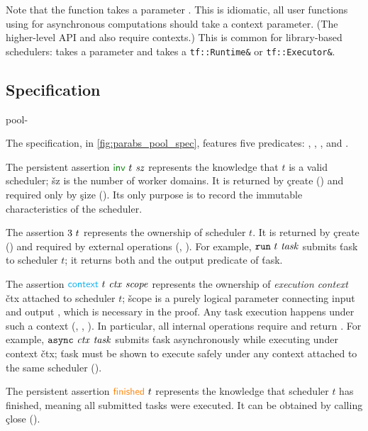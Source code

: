 Note that the  function takes a parameter . This is idiomatic, all user functions using  for asynchronous computations should take a context parameter. (The higher-level API  and  also require contexts.) This is common for library-based schedulers: \Domainslib takes a  parameter and \Taskflow takes a \texttt{tf::Runtime\&} or \texttt{tf::Executor\&}.

\subsection{Specification}
\label{sec:parabs_pool_spec}

\begin{tirPrefix}{pool-}



The specification, in \cref{fig:parabs_pool_spec}, features five predicates: \inv, \model, \context, \finished and \obligation.

The persistent assertion $\inv\ t\ \v{sz}$ represents the knowledge that $t$ is a valid scheduler; \v{sz} is the number of worker domains.
It is returned by \c{create} () and required only by \c{size} ().
Its only purpose is to record the immutable characteristics of the scheduler.

The assertion $3\ t$ represents the ownership of scheduler $t$.
It is returned by \c{create} () and required by external operations (, ).
For example, $\c{run}\ t\ \v{task}$ submits \v{task} to scheduler $t$; it returns both \model and the output predicate of \v{task}.

The assertion $\context\ t\ \v{ctx}\ \v{scope}$ represents the ownership of \emph{execution context} \v{ctx} attached to scheduler $t$; \v{scope} is a purely logical parameter connecting input and output \context, which is necessary in the proof.
Any task execution happens under such a context (, , ).
In particular, all internal operations require and return \context.
For example, $\c{async}\ \v{ctx}\ \v{task}$ submits \v{task} asynchronously while executing under context \v{ctx}; \v{task} must be shown to execute safely under any context attached to the same scheduler ().

The persistent assertion $\finished\ t$ represents the knowledge that scheduler $t$ has finished, meaning all submitted tasks were executed.
It can be obtained by calling \c{close} ().


\end{tirPrefix}
